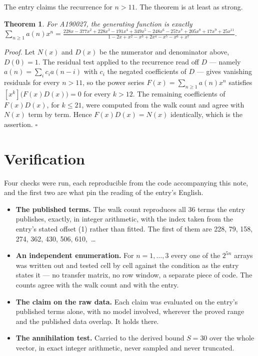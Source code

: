 \documentclass[11pt]{article}
\newtheorem{theorem}{Theorem}
\theoremstyle{definition}
\begin{document}
The entry claims the recurrence for $n > 11$. The theorem is at least as strong.

\begin{theorem} For A190027, the generating function is exactly $\sum_{n\ge 1} a(n)x^n = \frac{228x - 377x^{2} + 228x^{3} - 191x^{4} + 349x^{5} - 248x^{6} - 257x^{7} + 205x^{8} + 17x^{9} + 25x^{11}}{1 - 2x + x^{2} - x^{3} + 2x^{4} - x^{5} - x^{6} + x^{7}}$.\end{theorem}

{\itshape Proof.} Let $N(x)$ and $D(x)$ be the numerator and denominator above, $D(0)=1$. The residual test applied to the recurrence read off $D$ --- namely $a(n) = \sum_i c_i a(n-i)$ with $c_i$ the negated coefficients of $D$ --- gives vanishing residuals for every $n > 11$, so the power series $F(x)=\sum_{n\ge 1}a(n)x^n$ satisfies $[x^k]\bigl(F(x)D(x)\bigr) = 0$ for every $k > 12$. The remaining coefficients of $F(x)D(x)$, for $k \le 21$, were computed from the walk count and agree with $N(x)$ term by term. Hence $F(x)D(x) = N(x)$ identically, which is the assertion. $\square$

\section{Verification}

Four checks were run, each reproducible from the code accompanying this note, and the first two are what pin the reading of the entry's English.

\begin{itemize}

\item {\bfseries The published terms.} The walk count reproduces all 36 terms the entry publishes, exactly, in integer arithmetic, with the index taken from the entry's stated offset (1) rather than fitted. The first of them are 228, 79, 158, 274, 362, 430, 506, 610,~\dots

\item {\bfseries An independent enumeration.} For $n = 1,\dots,3$ every one of the $2^{5n}$ arrays was written out and tested cell by cell against the condition as the entry states it --- no transfer matrix, no row window, a separate piece of code. The counts agree with the walk count and with the entry.

\item {\bfseries The claim on the raw data.} Each claim was evaluated on the entry's published terms alone, with no model involved, wherever the proved range and the published data overlap. It holds there.

\item {\bfseries The annihilation test.} Carried to the derived bound $S = 30$ over the whole vector, in exact integer arithmetic, never sampled and never truncated.

\end{itemize}
\end{document}
